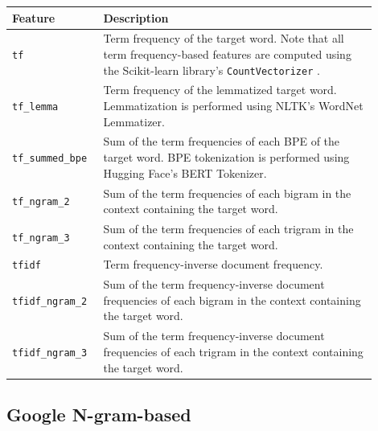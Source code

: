 \documentclass{dcthesis}
\theoremstyle{definition}
\theoremstyle{remark}
\begin{document}
\begin{table}[H]
  \centering
  \begin{tabular}{>{\centering\arraybackslash}p{0.2\linewidth}>{\arraybackslash}p{0.7\linewidth}}
    \textbf{Feature} & \textbf{Description} \\ \hline
    \texttt{tf} & Term frequency of the target word. Note that all term frequency-based features are computed using the Scikit-learn library's \texttt{CountVectorizer} \citep{pedregosa2011scikit}.\\
    \hline 
    \texttt{tf\_lemma} & Term frequency of the lemmatized target word. Lemmatization is performed using NLTK's WordNet Lemmatizer.\\
    \hline 
    \texttt{tf\_summed\_bpe} & Sum of the term frequencies of each BPE of the target word. BPE tokenization is performed using Hugging Face's BERT Tokenizer.\\
    \hline 
    \texttt{tf\_ngram\_2} & Sum of the term frequencies of each bigram in the context containing the target word.\\
    \hline 
    \texttt{tf\_ngram\_3} & Sum of the term frequencies of each trigram in the context containing the target word.\\
    \hline 
    \texttt{tfidf} & Term frequency-inverse document frequency.\\
    \hline 
    \texttt{tfidf\_ngram\_2} & Sum of the term frequency-inverse document frequencies of each bigram in the context containing the target word.\\
    \hline 
    \texttt{tfidf\_ngram\_3} & Sum of the term frequency-inverse document frequencies of each trigram in the context containing the target word.\\
  \end{tabular}
  \label{word_frequency_and_n_gram_features_gigaword_based}
\end{table}

\subsection{Google N-gram-based}
\end{document}
